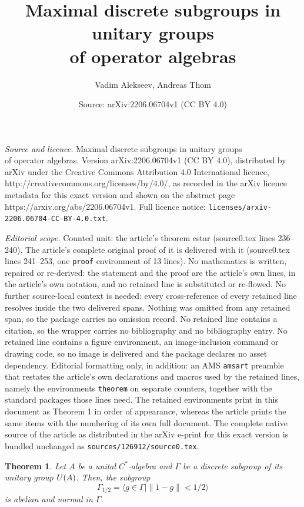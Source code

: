 \documentclass[10pt,a4paper]{amsart}
\title{Maximal discrete subgroups in unitary groups \\ of operator algebras}
\author{Vadim Alekseev, Andreas Thom}
\date{Source: arXiv:2206.06704v1 (CC BY 4.0)}
\newtheorem{theorem}{Theorem}
\begin{document}
\maketitle

\noindent\emph{Source and licence.} Maximal discrete subgroups in unitary groups \\ of operator algebras. Version arXiv:2206.06704v1 (CC BY 4.0), distributed by arXiv under the Creative Commons Attribution 4.0 International licence, http://creativecommons.org/licenses/by/4.0/, as recorded in the arXiv licence metadata for this exact version and shown on the abstract page https://arxiv.org/abs/2206.06704v1. Full licence notice: \texttt{licenses/arxiv-2206.06704-CC-BY-4.0.txt}.\par\smallskip

\noindent\textit{Editorial scope.} Counted unit: the article's theorem cstar (source0.tex lines 236--240). The article's complete original proof of it is delivered with it (source0.tex lines 241--253, one \texttt{proof} environment of 13 lines). No mathematics is written, repaired or re-derived: the statement and the proof are the article's own lines, in the article's own notation, and no retained line is substituted or re-flowed.  No further source-local context is needed: every cross-reference of every retained line resolves inside the two delivered spans.  Nothing was omitted from any retained span, so the package carries no omission record.  No retained line contains a citation, so the wrapper carries no bibliography and no bibliography entry.  No retained line contains a figure environment, an image-inclusion command or drawing code, so no image is delivered and the package declares no asset dependency.  Editorial formatting only, in addition: an AMS \texttt{amsart} preamble that restates the article's own declarations and macros used by the retained lines, namely the environments \texttt{theorem} on separate counters, together with the standard packages those lines need.  The retained environments print in this document as Theorem 1 in order of appearance, whereas the article prints the same items with the numbering of its own full document.  The complete native source of the article as distributed in the arXiv e-print for this exact version is bundled unchanged as \texttt{sources/126912/source0.tex}.
\begin{theorem}\label{cstar}
Let $A$ be a unital $C^*$-algebra and $\Gamma$ be a discrete subgroup of its unitary group ${\rm U}(A)$. Then, the subgroup
$$\Gamma_{1/2} = \langle g \in \Gamma \mid \|1-g\|<1/2 \rangle$$
is abelian and normal in $\Gamma$.
\end{theorem}
\end{document}
